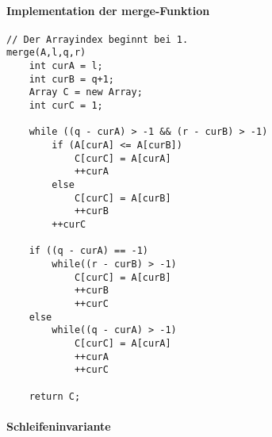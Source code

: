 \paragraph{Implementation der merge-Funktion}
\begin{verbatim}
// Der Arrayindex beginnt bei 1.
merge(A,l,q,r)
    int curA = l;
    int curB = q+1;
    Array C = new Array;
    int curC = 1;

    while ((q - curA) > -1 && (r - curB) > -1)
        if (A[curA] <= A[curB])
            C[curC] = A[curA]
            ++curA
        else
            C[curC] = A[curB]
            ++curB
        ++curC

    if ((q - curA) == -1)
        while((r - curB) > -1)
            C[curC] = A[curB]
            ++curB
            ++curC
    else
        while((q - curA) > -1)
            C[curC] = A[curA]
            ++curA
            ++curC

    return C;
\end{verbatim}

\paragraph{Schleifeninvariante}


